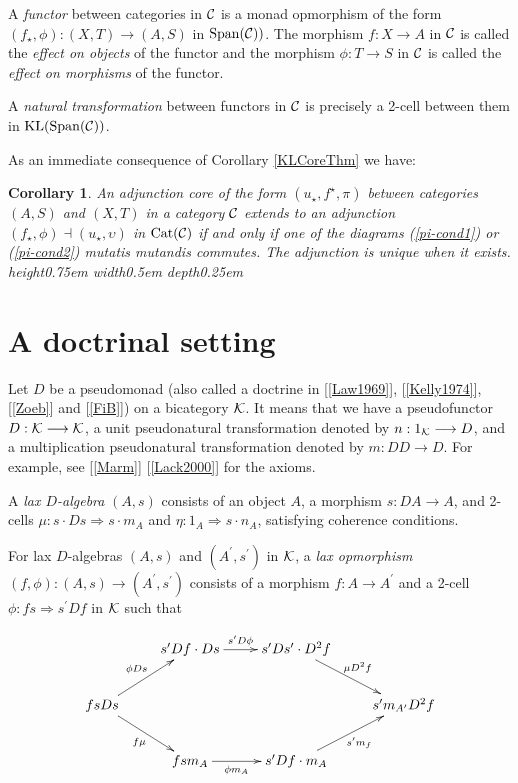 \documentclass[a4paper,10pt]{article}
\newcommand{\qed}{\nobreak \ifvmode \relax \else
      \ifdim\lastskip<1.5em \hskip-\lastskip
      \hskip1.5em plus0em minus0.5em \fi \nobreak
      \vrule height0.75em width0.5em depth0.25em\fi}
\newtheorem{corollary}[theorem]{Corollary}
\newcommand{\bc}{{\cal{C}}}
\newcommand{\bk}{{\cal{K}}}
\numberwithin{equation}{section}
\begin{document}
A \textit{functor} between categories in $\bc$ is a monad opmorphism of the form $(f_{\star},\phi) : (X,T) \longrightarrow (A,S)$ in $\mathrm{Span}(\bc))$. The morphism $f:X \longrightarrow A$ in $\bc$ is called the \textit{effect on objects} of the functor and the morphism $\phi : T \longrightarrow S$ in $\bc$ is called the \textit{effect on morphisms} of the functor.    

A \textit{natural transformation} between functors in $\bc$ is precisely a 2-cell between them in $\mathrm{KL}(\mathrm{Span}(\bc))$.   

As an immediate consequence of Corollary \ref{KLCoreThm} we have:

\begin{corollary} \label{IntCatCoreThm}
An adjunction core of the form $(u_{\star},f^{\star},\pi)$ between categories $(A,S)$ and $(X,T)$ in a category $\bc$  extends to an adjunction $(f_{\star}, \phi)  \dashv (u_{\star}, \upsilon)$ in $\mathrm{Cat}(\bc)$ if and only if one of the diagrams (\ref{pi-cond1}) or (\ref{pi-cond2}) \emph{mutatis mutandis} commutes. The adjunction is unique when it exists. \qed
\end{corollary}

\section{A doctrinal setting}\label{doctrinal}   

Let $D$ be a pseudomonad (also called a doctrine in [\ref{Law1969}], [\ref{Kelly1974}], [\ref{Zoeb}] and [\ref{FiB}]) on a bicategory $\bk$. It means that we have a pseudofunctor $D : \bk \longrightarrow \bk$, a unit pseudonatural transformation denoted by $n : 1_{\bk} \longrightarrow D$, and a multiplication pseudonatural transformation denoted by  $m : DD \longrightarrow D$. For example, see [\ref{Marm}] [\ref{Lack2000}] for the axioms. 

A \textit{lax $D$-algebra} $(A,s)$ consists of an object $A$, a morphism $s:DA \longrightarrow A$, and 2-cells $\mu : s \cdot Ds \Longrightarrow s \cdot m_A$ and  $\eta : 1_A \Longrightarrow s \cdot n_A$, satisfying coherence conditions.  

For lax $D$-algebras $(A,s)$ and $(A^{\prime },s^{\prime })$ in $\bk$, a {\it lax opmorphism} $(f,\phi):(A,s) \longrightarrow (A^{\prime },s^{\prime })$ consists of a morphism $f:A \longrightarrow A^{\prime }$ and a 2-cell $\phi: fs \Longrightarrow s^{\prime } Df$ in $\bk$ such that

\begin{equation} \label{laxopmor1}
\xymatrix{
& s^{\prime}Df \cdot Ds \ar[r]^-{s^{\prime} D\phi} & s^{\prime} Ds^{\prime} \cdot D^{2} f \ar[rd]^-{\mu D^{2} f} & \\
fsDs \ar[ru]^-{\phi Ds} \ar[rd]_-{f \mu} & & & s^{\prime} m_{A^{\prime }} D^{2} f \\
& fsm_A \ar[r]_-{\phi m_A} & s^{\prime} Df \cdot m_A \ar[ru]_-{s^{\prime} m_f} &}
\end{equation}
\end{document}
